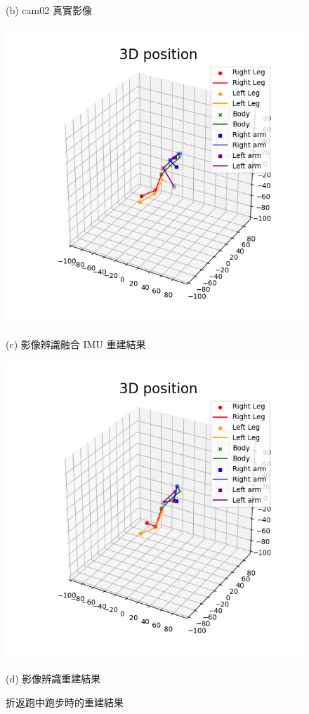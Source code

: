 \begin{figure}[!ht]
\begin{minipage}{.5\textwidth}
       \caption*{(b) cam02 真實影像}
    \end{minipage}
    \begin{minipage}{.5\textwidth}
       \centering
       \includegraphics[width=.95\linewidth]{figure/ch4_fig_run_result_with1.png}
       \caption*{(c) 影像辨識融合 IMU 重建結果}
    \end{minipage}%
    \begin{minipage}{.5\textwidth}
       \centering
       \includegraphics[width=.95\linewidth]{figure/ch4_fig_run_result_no1.png}
       \caption*{(d) 影像辨識重建結果}
    \end{minipage}
   \caption[折返跑中跑步時的重建結果]{折返跑中跑步時的重建結果}
   \label{ch4_fig_run_run}
\end{figure}

